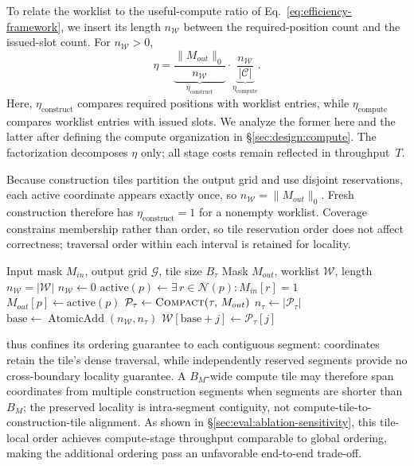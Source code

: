 To relate the worklist to the useful-compute ratio of
Eq.~\ref{eq:efficiency-framework}, we insert its length $n_{\mathcal{W}}$ between the
required-position count and the issued-slot count. For
$n_{\mathcal{W}}>0$,
\begin{equation}
  \eta
  = \underbrace{\frac{\|M_{out}\|_0}{n_{\mathcal{W}}}}_{\eta_{\mathrm{construct}}}
  \cdot
  \underbrace{\frac{n_{\mathcal{W}}}{|\mathcal{C}|}}_{\eta_{\mathrm{compute}}} .
  \label{eq:eta-decomp}
\end{equation}
Here, $\eta_{\mathrm{construct}}$ compares required positions with worklist
entries, while $\eta_{\mathrm{compute}}$ compares worklist entries with issued
slots. We analyze the former here and the latter after defining the compute
organization in \S\ref{sec:design:compute}. The factorization decomposes
$\eta$ only; all stage costs remain reflected in throughput~$T$.

Because construction tiles partition the output grid and use disjoint
reservations, each active coordinate appears exactly once, so
$n_{\mathcal{W}}=\|M_{out}\|_0$. Fresh construction therefore has
$\eta_{\mathrm{construct}}=1$ for a nonempty worklist. Coverage constrains
membership rather than order, so tile reservation order does not affect
correctness; traversal order within each interval is retained for locality.

\begin{algorithm}[t]
\caption{Tile-Local Worklist Construction}
\label{alg:construct}
\begin{algorithmic}[1]
\REQUIRE Input mask $M_{in}$, output grid $\mathcal{G}$, tile size $B_\tau$
\ENSURE Mask $M_{out}$, worklist $\mathcal{W}$, length
        $n_{\mathcal{W}}=|\mathcal{W}|$
\STATE $n_{\mathcal{W}} \leftarrow 0$
    \STATE $\mathrm{active}(p) \leftarrow \exists\, r \in \mathcal{N}(p): M_{in}[r] = 1$
    \STATE $M_{out}[p] \leftarrow \mathrm{active}(p)$
  \ENDFOR
  \STATE $\mathcal{P}_\tau \leftarrow \textsc{Compact}(\tau,\,M_{out})$
  \STATE $n_\tau \leftarrow |\mathcal{P}_\tau|$
  \STATE $\mathrm{base} \leftarrow
         \operatorname{AtomicAdd}(n_{\mathcal{W}},n_\tau)$
    \STATE $\mathcal{W}[\mathrm{base}+j] \leftarrow \mathcal{P}_\tau[j]$
  \ENDFOR
\ENDFOR
\end{algorithmic}
\end{algorithm}

\sysname thus confines its ordering guarantee to each contiguous segment:
coordinates retain the tile's dense traversal, while independently reserved
segments provide no cross-boundary locality guarantee. A $B_M$-wide compute
tile may therefore span coordinates from multiple construction segments when
segments are shorter than $B_M$; the preserved locality is intra-segment
contiguity, not compute-tile-to-construction-tile alignment. As shown in
\S\ref{sec:eval:ablation-sensitivity}, this tile-local order achieves compute-stage
throughput comparable to global ordering, making the additional ordering pass
an unfavorable end-to-end trade-off.

